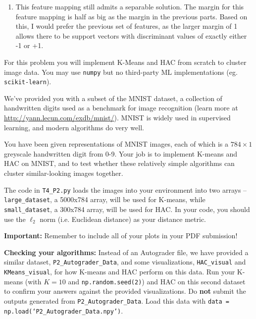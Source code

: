 \documentclass[submit]{harvardml}
\begin{document}
\begin{enumerate}
\item
This feature mapping still admits a separable solution. The margin for this feature mapping is half as 
big as the margin in the previous parts. Based on this, I would prefer the previous set of features,
as the larger margin of 1 allows there to be support vectors with discriminant values 
of exactly either -1 or +1.


\end{enumerate}
\newpage


\begin{problem}

For this problem you will implement K-Means and HAC from scratch to cluster image data. You may use \texttt{numpy} but no third-party ML implementations (eg. \texttt{scikit-learn}).

We've provided you with a subset of the MNIST dataset, a collection of
handwritten digits used as a benchmark for image recognition (learn more at
\url{http://yann.lecun.com/exdb/mnist/}). MNIST is widely used in supervised learning, and modern algorithms do very well. 

You have been given
representations of MNIST images, each of which is a $784\times1$
greyscale handwritten digit from 0-9. Your job is to implement K-means and HAC on MNIST, and to test whether these relatively
simple algorithms can cluster similar-looking images together.

The code in \texttt{T4\_P2.py} loads the images into your environment into two arrays -- \texttt{large\_dataset}, a 5000x784 array, will be used for K-means, while \texttt{small\_dataset}, a 300x784 array, will be used for HAC. In your code, you should use the $\ell_2$ norm (i.e. Euclidean distance) as your distance metric.

\textbf{Important:} Remember to include all of your plots in your PDF submission!

\textbf{Checking your algorithms:} Instead of an Autograder file, we have provided a similar dataset, \texttt{P2\_Autograder\_Data}, and some visualizations, \texttt{HAC\_visual} and \texttt{KMeans\_visual}, for how K-means and HAC perform on this data. Run your K-means (with $K=10$ and \texttt{np.random.seed(2)}) and HAC on this second dataset to confirm your answers against the provided visualizations. Do \textbf{not} submit the outputs generated from \texttt{P2\_Autograder\_Data}. Load this data with \texttt{data = np.load(`P2\_Autograder\_Data.npy')}.


\end{problem}
\end{document}
